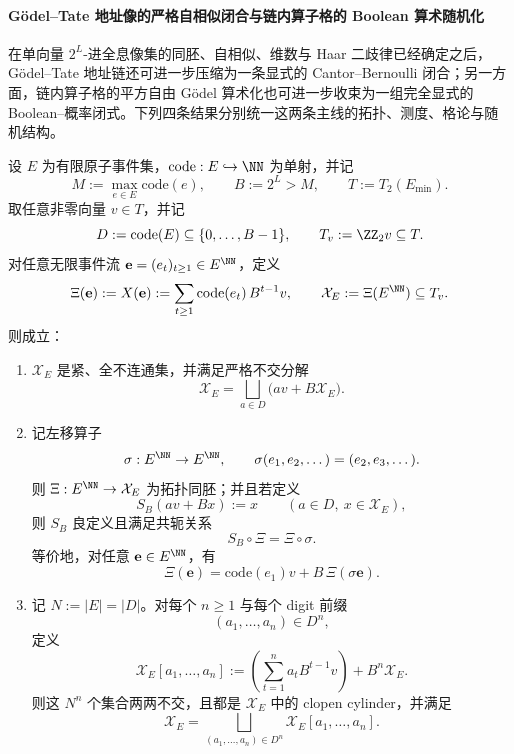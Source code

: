 \paragraph{Gödel--Tate 地址像的严格自相似闭合与链内算子格的 Boolean 算术随机化}
在单向量 \(2^L\)-进全息像集的同胚、自相似、维数与 Haar 二歧律已经确定之后，Gödel--Tate 地址链还可进一步压缩为一条显式的 Cantor--Bernoulli 闭合；另一方面，链内算子格的平方自由 Gödel 算术化也可进一步收束为一组完全显式的 Boolean--概率闭式。下列四条结果分别统一这两条主线的拓扑、测度、格论与随机结构。

\begin{theorem}\label{thm:xi-time-part65d-godeltate-selfsimilar-shift-cylinder}
设 \(E\) 为有限原子事件集，\(\mathrm{code}:E\hookrightarrow \NN\) 为单射，并记
\[
M:=\max_{e\in E}\mathrm{code}(e),
\qquad
B:=2^L>M,
\qquad
T:=T_2(E_{\min}).
\]
取任意非零向量 \(v\in T\)，并记
\[
D:=\mathrm{code}(E)\subseteq \{0,\dots,B-1\},
\qquad
T_v:=\ZZ_2v\subseteq T.
\]
对任意无限事件流 \(\mathbf e=(e_t)_{t\ge 1}\in E^{\NN}\)，定义
\[
\Xi(\mathbf e):=X(\mathbf e):=\sum_{t\ge 1}\mathrm{code}(e_t)\,B^{t-1}v,
\qquad
\mathcal X_E:=\Xi(E^{\NN})\subseteq T_v.
\]
则成立：
\begin{enumerate}
  \item \(\mathcal X_E\) 是紧、全不连通集，并满足严格不交分解
  \[
  \mathcal X_E=\bigsqcup_{a\in D}\bigl(av+B\mathcal X_E\bigr).
  \]
  \item 记左移算子
  \[
  \sigma:E^{\NN}\to E^{\NN},
  \qquad
  \sigma(e_1,e_2,\dots)=(e_2,e_3,\dots).
  \]
  则 \(\Xi:E^{\NN}\to \mathcal X_E\) 为拓扑同胚；并且若定义
  \[
  S_B(av+Bx):=x
  \qquad
  (a\in D,\ x\in \mathcal X_E),
  \]
  则 \(S_B\) 良定义且满足共轭关系
  \[
  S_B\circ \Xi=\Xi\circ \sigma.
  \]
  等价地，对任意 \(\mathbf e\in E^{\NN}\)，有
  \[
  \Xi(\mathbf e)=\mathrm{code}(e_1)v+B\,\Xi(\sigma\mathbf e).
  \]
  \item 记 \(N:=|E|=|D|\)。对每个 \(n\ge 1\) 与每个 digit 前缀
  \[
  (a_1,\dots,a_n)\in D^n,
  \]
  定义
  \[
  \mathcal X_E[a_1,\dots,a_n]
  :=
  \left(\sum_{t=1}^{n}a_tB^{t-1}v\right)+B^n\mathcal X_E.
  \]
  则这 \(N^n\) 个集合两两不交，且都是 \(\mathcal X_E\) 中的 clopen cylinder，并满足
  \[
  \mathcal X_E=\bigsqcup_{(a_1,\dots,a_n)\in D^n}\mathcal X_E[a_1,\dots,a_n].
  \]
\end{enumerate}
\end{theorem}

